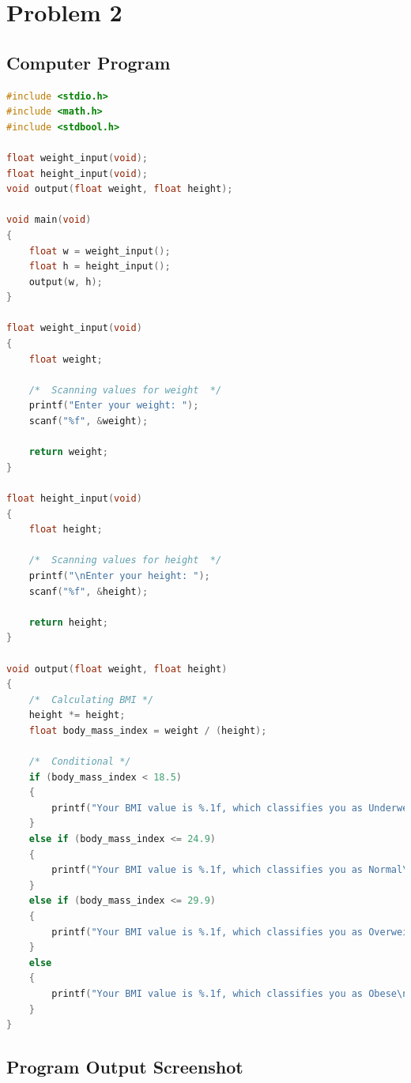 \section{{Problem 2}}
	
		\subsection{{Computer Program}}
	
			\begin{lstlisting}[language=C, caption=\textit{Program to Calculate the Body Mass Index (BMI) of a person}]	
#include <stdio.h>
#include <math.h>
#include <stdbool.h>

float weight_input(void);
float height_input(void);
void output(float weight, float height);

void main(void)
{
    float w = weight_input();
    float h = height_input();
    output(w, h);
}

float weight_input(void)
{
    float weight;

    /*  Scanning values for weight  */
    printf("Enter your weight: ");
    scanf("%f", &weight);

    return weight;
}

float height_input(void)
{
    float height;

    /*  Scanning values for height  */
    printf("\nEnter your height: ");
    scanf("%f", &height);

    return height;
}

void output(float weight, float height)
{
    /*  Calculating BMI */
    height *= height;
    float body_mass_index = weight / (height);

    /*  Conditional */
    if (body_mass_index < 18.5)
    {
        printf("Your BMI value is %.1f, which classifies you as Underweight\n", body_mass_index);
    }
    else if (body_mass_index <= 24.9)
    {
        printf("Your BMI value is %.1f, which classifies you as Normal\n", body_mass_index);
    }
    else if (body_mass_index <= 29.9)
    {
        printf("Your BMI value is %.1f, which classifies you as Overweight\n", body_mass_index);
    }
    else
    {
        printf("Your BMI value is %.1f, which classifies you as Obese\n", body_mass_index);
    }
}
	\end{lstlisting}

		\subsection{{Program Output Screenshot}}
			
